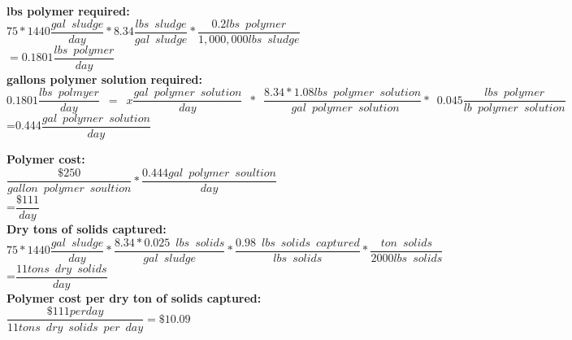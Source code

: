 \begin{enumerate}
\vspace{0.25cm}
\textbf{lbs polymer required:}\\
\vspace{0.25cm}
$75*1440 \dfrac{gal \enspace sludge}{day}* 8.34 \dfrac{lbs \enspace sludge}{gal \enspace sludge} *\dfrac{0.2lbs \enspace polymer}{1,000,000 lbs \enspace sludge}$\\
\vspace{0.25cm}
$= 0.1801 \dfrac{lbs \enspace polymer}{day}$\\

\vspace{0.25cm}
\textbf{gallons polymer solution required:}\\
\vspace{0.25cm}
$0.1801 \dfrac{lbs \enspace polmyer}{day}\enspace=\enspace x \dfrac{gal \enspace polymer \enspace solution}{day} \enspace * \enspace \dfrac{8.34*1.08lbs \enspace polymer \enspace solution}{\enspace gal \enspace polymer \enspace solution}* \enspace 0.045 \dfrac{lbs \enspace polymer}{lb \enspace polymer \enspace solution}$\\
\vspace{0.25cm}
=0.444$\dfrac{gal \enspace polymer \enspace solution}{day}$
\vspace{0.25cm}

\textbf{Polymer cost:}\\
$\dfrac{\$250}{gallon \enspace polymer \enspace soultion}*\dfrac{0.444 gal \enspace polymer \enspace soultion}{day}$\\
\vspace{0.25cm}
=$\dfrac{\$111}{day}$\\
\vspace{0.25cm}
\textbf{Dry tons of solids captured:}\\
$ 75*1440\dfrac{gal \enspace sludge}{day}*\dfrac{8.34*0.025\enspace lbs \enspace solids}{gal \enspace sludge}*\dfrac{0.98\enspace lbs \enspace solids \enspace captured}{lbs \enspace solids}*\dfrac{ton \enspace solids}{2000 lbs \enspace solids}$\\
\vspace{0.25cm}
=$\dfrac{11tons \enspace dry \enspace solids}{day}$\\
\vspace{0.25cm}
\textbf{Polymer cost per dry ton of solids captured:}\\
\vspace{0.25cm}
$\dfrac{\$111 per day}{11 tons \enspace dry \enspace solids \enspace per \enspace day}= \boxed{\$10.09}$


\end{enumerate}
